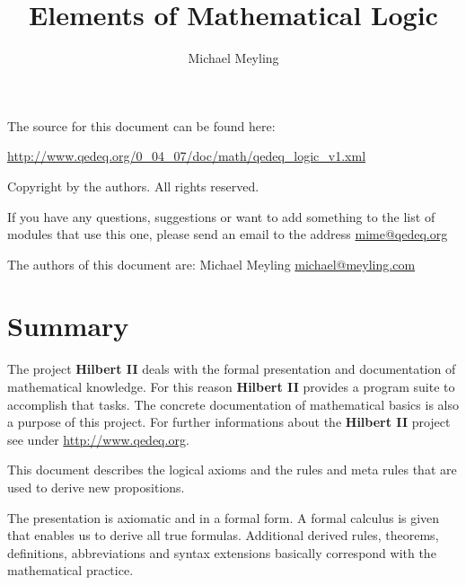 \documentclass[a4paper,german,10pt,twoside]{book}
\title{Elements of Mathematical Logic}
\author{
Michael Meyling
}
\theoremstyle{definition}
\theoremstyle{remark}
\begin{document}
\maketitle

\setlength{\parskip}{5pt plus 2pt minus 1pt}
\mbox{}
\vfill

\par
The source for this document can be found here:
\par
\url{http://www.qedeq.org/0_04_07/doc/math/qedeq_logic_v1.xml}

\par
Copyright by the authors. All rights reserved.
\par
If you have any questions, suggestions or want to add something to the list of modules that use this one, please send an email to the address \href{mailto:mime@qedeq.org}{mime@qedeq.org}

\par
The authors of this document are:
Michael Meyling \href{mailto:michael@meyling.com}{michael@meyling.com}



\setlength{\parskip}{0pt}
\tableofcontents

\setlength{\parskip}{5pt plus 2pt minus 1pt}

\chapter*{Summary} \label{chapter1} \hypertarget{chapter1}{}

The project \textbf{Hilbert II} deals with the formal presentation and documentation of mathematical knowledge. For this reason \textbf{Hilbert II} provides a program suite to accomplish that tasks. The concrete documentation of mathematical basics is also a purpose of this project.   
For further informations about the \textbf{Hilbert II} project see under \url{http://www.qedeq.org}.

\par
This document describes the logical axioms and the rules and meta rules that are used to derive new propositions.

\par
The presentation is axiomatic and in a formal form. A formal calculus is given that enables us to derive all true formulas. Additional derived rules, theorems, definitions, abbreviations and syntax extensions basically correspond with the mathematical practice.
\end{document}
